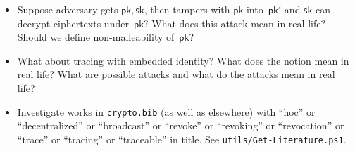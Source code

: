\begin{itemize}
\item Suppose adversary gets $\mathsf{pk},\mathsf{sk}$, then tampers with $\mathsf{pk}$ into~$\mathsf{pk}'$ and $\mathsf{sk}$ can decrypt ciphertexts under~$\mathsf{pk}$?
What does this attack mean in real life?
Should we define non-malleability of~$\mathsf{pk}$?
\item What about tracing with embedded identity?
What does the notion mean in real life?
What are possible attacks and what do the attacks mean in real life?
\item Investigate works in \texttt{crypto.bib} (as well as elsewhere) with ``\ad hoc'' or ``decentralized'' or ``broadcast'' or ``revoke'' or ``revoking'' or ``revocation'' or ``trace'' or ``tracing'' or ``traceable'' in title.
See \texttt{utils/Get-Literature.ps1}.
\end{itemize}
